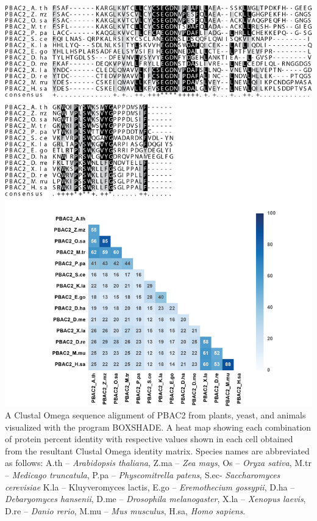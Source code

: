 \begin{FPfigure}
	\ContinuedFloat
	\centering
	\includegraphics[width=\columnwidth]{Proteasome/pbac2align2.png}
	{A Clustal Omega \citep{sievers14} sequence alignment of PBAC2 from plants, yeast, and animals visualized with the program BOXSHADE. A heat map showing each combination of protein percent identity with respective values shown in each cell obtained from the resultant Clustal Omega identity matrix. Species names are abbreviated as follows: A.th – \textit{Arabidopsis thaliana}, Z.ma – \textit{Zea mays}, Os – \textit{Oryza sativa}, M.tr – \textit{Medicago truncatula}, P.pa – \textit{Physcomitrella patens}, S.ec- \textit{Saccharomyces cerevisiae} K.la – {Kluyveromyces lactis}, E.go – \textit{Eremothecium gossypii}, D.ha – \textit{Debaryomyces hansenii}, D.me – \textit{Drosophila melanogaster}, X.la – \textit{Xenopus laevis}, D.re – \textit{Danio rerio}, M.mu – \textit{Mus musculus}, H.sa, \textit{Homo sapiens}.}
	\label{fig:pbac2align2}
\end{FPfigure}
